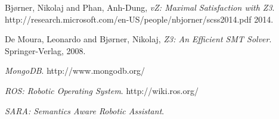 \documentclass[11pt]{article}
\begin{document}
\begin{thebibliography}{9}

  Bj{\o}rner, Nikolaj and Phan, Anh-Dung,
  \emph{vZ: Maximal Satisfaction with Z3}.
  http://research.microsoft.com/en-US/people/nbjorner/scss2014.pdf
  2014.

  De Moura, Leonardo and Bj{\o}rner, Nikolaj,
  \emph{Z3: An Efficient SMT Solver}.
  Springer-Verlag,
  2008.

  \emph{MongoDB}.
  http://www.mongodb.org/

  \emph{ROS: Robotic Operating System}.
  http://wiki.ros.org/

  \emph{SARA: Semantics Aware Robotic Assistant}.

\end{thebibliography}
\end{document}
